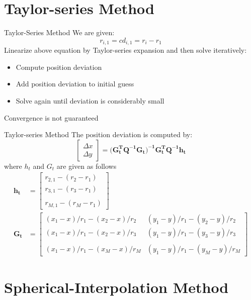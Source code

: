 \documentclass[10pt]{beamer}
\begin{document}
\section{Taylor-series Method}

\begin{frame}{Taylor-Series Method}
	We are given:
  $$ r_{i,1}=cd_{i,1}=r_{i}-r_{1} $$
  Linearize above equation by Taylor-series expansion and then solve iteratively:
	\begin{itemize}
    \item Compute position deviation
    \item Add position deviation to initial guess
    \item Solve again until deviation is considerably small
  \end{itemize}
  \alert{Convergence is not guaranteed}
\end{frame}


\begin{frame}{Taylor-series Method}
	The position deviation is computed by:
   $$\begin{bmatrix} \Delta x \\ \Delta y \end{bmatrix} = (\mathbf{G_{t}^T Q^{-1} G_{t})^{-1} G_{t}^T Q^{-1} h_{t}}$$
  where $h_{t}$ and $G_{t}$ are given as follows
 \begin{align}
    \mathbf{h_{t}} &= \begin{bmatrix} r_{2,1} - (r_{2}-r_{1}) \\  r_{3,1} - (r_{3}-r_{1})\\  \quad\\  r_{M,1} - (r_{M}-r_{1}) \end{bmatrix}  \\
    \mathbf{G_{t}} &= \begin{bmatrix} (x_{1}-x)/r_{1} - (x_{2}-x)/r_{2} & (y_{1}-y)/r_{1} - (y_{2}-y)/r_{2} \\ (x_{1}-x)/r_{1} - (x_{2}-x)/r_{3} & (y_{1}-y)/r_{1} - (y_{3}-y)/r_{3}\\  \quad\\ (x_{1}-x)/r_{1} - (x_{M}-x)/r_{M} & (y_{1}-y)/r_{1} - (y_{M}-y)/r_{M} \end{bmatrix}
  \end{align}

\end{frame}

\section{Spherical-Interpolation Method}
\end{document}
